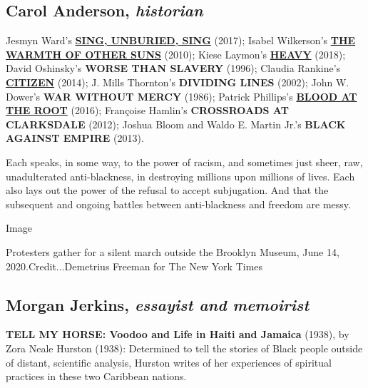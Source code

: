 \hypertarget{carol-anderson-historian}{%
\subsection{\texorpdfstring{Carol Anderson,
\emph{historian}}{Carol Anderson, historian}}\label{carol-anderson-historian}}

Jesmyn Ward's
\textbf{\href{https://www.nytimes.com/2017/09/05/books/review-sing-unburied-sing-jesmyn-ward.html}{SING,
UNBURIED, SING}} (2017); Isabel Wilkerson's
\textbf{\href{https://www.nytimes.com/2010/09/05/books/review/Oshinsky-t.html}{THE
WARMTH OF OTHER SUNS}} (2010); Kiese Laymon's
\textbf{\href{https://www.nytimes.com/2018/11/13/books/review/kiese-laymon-heavy.html}{HEAVY}}
(2018); David Oshinsky's \textbf{WORSE THAN SLAVERY} (1996); Claudia
Rankine's
\textbf{\href{https://www.nytimes.com/2014/12/28/books/review/claudia-rankines-citizen.html}{CITIZEN}}
(2014); J. Mills Thornton's \textbf{DIVIDING LINES} (2002); John W.
Dower's \textbf{WAR WITHOUT MERCY} (1986); Patrick Phillips's
\textbf{\href{https://www.nytimes.com/2016/09/15/books/review-blood-at-the-root-a-tale-of-racial-cleansing-close-to-home.html}{BLOOD
AT THE ROOT}} (2016); Françoise Hamlin's \textbf{CROSSROADS AT
CLARKSDALE} (2012); Joshua Bloom and Waldo E. Martin Jr.'s \textbf{BLACK
AGAINST EMPIRE} (2013).

Each speaks, in some way, to the power of racism, and sometimes just
sheer, raw, unadulterated anti-blackness, in destroying millions upon
millions of lives. Each also lays out the power of the refusal to accept
subjugation. And that the subsequent and ongoing battles between
anti-blackness and freedom are messy.

Image

Protesters gather for a silent march outside the Brooklyn Museum, June
14, 2020.Credit...Demetrius Freeman for The New York Times

\hypertarget{morgan-jerkins-essayist-and-memoirist}{%
\subsection{\texorpdfstring{Morgan Jerkins, \emph{essayist and
memoirist}}{Morgan Jerkins, essayist and memoirist}}\label{morgan-jerkins-essayist-and-memoirist}}

\textbf{TELL MY HORSE: Voodoo and Life in Haiti and Jamaica} (1938), by
Zora Neale Hurston (1938): Determined to tell the stories of Black
people outside of distant, scientific analysis, Hurston writes of her
experiences of spiritual practices in these two Caribbean nations.

